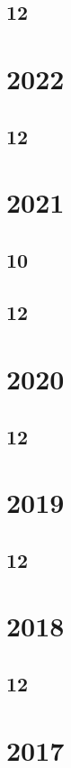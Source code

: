 \documentclass[11pt]{book}
\begin{document}
\subsection{12}

\section{2022}
\subsection{12}

\section{2021}
\subsection{10}

\subsection{12}

\section{2020} 
\subsection{12} 

\section{2019} 
\subsection{12}





\section{2018} 
\subsection{12}



\section{2017}
\end{document}

